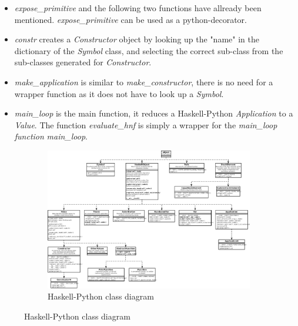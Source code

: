 \begin{itemize}

\item \emph{expose\_primitive} and the following two functions have allready been 
mentioned. \emph{expose\_primitive} can be used as a python-decorator.

\item \emph{constr} creates a \emph{Constructor} object by looking up the "name" in
the dictionary of the \emph{Symbol} class, and selecting the correct sub-class from the
sub-classes generated for \emph{Constructor}.

\item \emph{make\_application} is similar to \emph{make\_constructor}, there is no
need for a wrapper function as it does not have to look up a \emph{Symbol}.

\item \emph{main\_loop} is the main function, it reduces a Haskell-Python 
\emph{Application} to a \emph{Value}. The function \emph{evaluate\_hnf} is
simply a wrapper for the \emph{main\_loop function}
\emph{main\_loop}.

\end{itemize}


\begin{figure}
\begin{figure}[H]
\centering
\includegraphics[width=\textheight]{../diags/core-interp.pdf}

\caption{Haskell-Python class diagram}
\label{fig:coreinterp}

\end{figure}
\end{figure}



